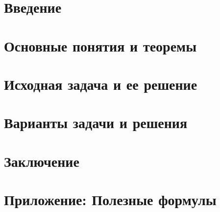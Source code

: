 \documentclass{report}%
\begin{document}


\tableofcontents


\setcounter{page}{2}
\chapter{Введение}


\chapter{Основные понятия и теоремы}


\chapter{Исходная задача и ее решение}


\chapter{Варианты задачи и решения}


\chapter{Заключение}


\appendix
\chapter{Приложение: Полезные формулы}


\printbibliography
\end{document}
